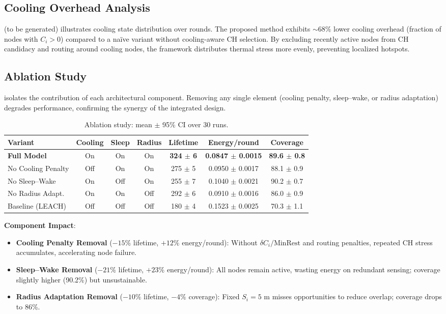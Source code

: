 \subsection{Cooling Overhead Analysis}

 (to be generated) illustrates cooling state distribution over rounds. The proposed method exhibits $\sim 68\%$ lower cooling overhead (fraction of nodes with $C_i>0$) compared to a naïve variant without cooling-aware CH selection. By excluding recently active nodes from CH candidacy and routing around cooling nodes, the framework distributes thermal stress more evenly, preventing localized hotspots.

\subsection{Ablation Study}

 isolates the contribution of each architectural component. Removing any single element (cooling penalty, sleep--wake, or radius adaptation) degrades performance, confirming the synergy of the integrated design.

\begin{table}[ht]
  \centering
  \caption{Ablation study: mean $\pm$ 95\% CI over 30 runs.}
  \label{tab:ablation}
  \begin{tabular}{@{}lcccccc@{}}
    \toprule
    Variant & Cooling & Sleep & Radius & Lifetime & Energy/round & Coverage \\
    \midrule
    \textbf{Full Model} & On & On & On & \textbf{324 $\pm$ 6} & \textbf{0.0847 $\pm$ 0.0015} & \textbf{89.6 $\pm$ 0.8} \\
    No Cooling Penalty & Off & On & On & 275 $\pm$ 5 & 0.0950 $\pm$ 0.0017 & 88.1 $\pm$ 0.9 \\
    No Sleep--Wake & On & Off & On & 255 $\pm$ 7 & 0.1040 $\pm$ 0.0021 & 90.2 $\pm$ 0.7 \\
    No Radius Adapt. & On & On & Off & 292 $\pm$ 6 & 0.0910 $\pm$ 0.0016 & 86.0 $\pm$ 0.9 \\
    Baseline (LEACH) & Off & Off & Off & 180 $\pm$ 4 & 0.1523 $\pm$ 0.0025 & 70.3 $\pm$ 1.1 \\
    \bottomrule
  \end{tabular}
\end{table}

\textbf{Component Impact}:
\begin{itemize}[noitemsep]
  \item \textbf{Cooling Penalty Removal} ($-15\%$ lifetime, $+12\%$ energy/round): Without $\delta C_i/\text{MinRest}$ and routing penalties, repeated CH stress accumulates, accelerating node failure.
  \item \textbf{Sleep--Wake Removal} ($-21\%$ lifetime, $+23\%$ energy/round): All nodes remain active, wasting energy on redundant sensing; coverage slightly higher (90.2\%) but unsustainable.
  \item \textbf{Radius Adaptation Removal} ($-10\%$ lifetime, $-4\%$ coverage): Fixed $S_i=5$ m misses opportunities to reduce overlap; coverage drops to 86\%.
\end{itemize}

